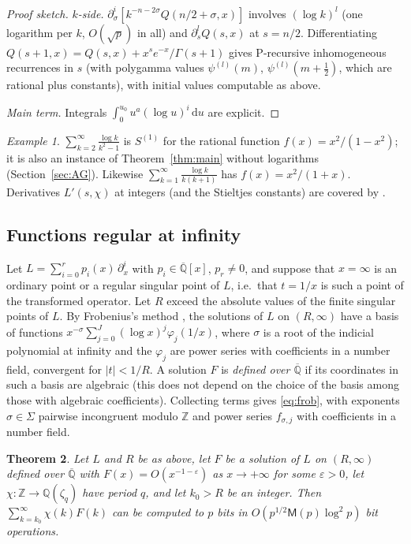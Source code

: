 \documentclass[11pt,reqno]{amsart}
\newtheorem{theorem}{Theorem}[section]
\theoremstyle{definition}
\theoremstyle{remark}
\newtheorem{example}[theorem]{Example}
\newcommand{\dd}{\,\mathrm{d}}
\newcommand{\QQ}{\mathbb{Q}}
\newcommand{\Qbar}{\overline{\mathbb{Q}}}
\newcommand{\ZZ}{\mathbb{Z}}
\newcommand{\Mul}{\mathsf{M}}
\begin{document}
\begin{proof}[Proof sketch]
\emph{$k$-side.} $\partial_\sigma^i[k^{-n-2\sigma}Q(n/2+\sigma, x)]$ involves $(\log k)^l$ (one logarithm per $k$, $O(\sqrt p)$ in all) and
$\partial_s^l Q(s, x)$ at $s = n/2$. Differentiating $Q(s+1, x) = Q(s, x) + x^se^{-x}/\Gamma(s+1)$ gives
P-recursive inhomogeneous recurrences in $s$ (with polygamma values $\psi^{(l)}(m)$, $\psi^{(l)}(m+\frac12)$, which
are rational plus constants), with initial values computable as above.

\emph{Main term.} Integrals $\int_0^{u_0}u^{a}(\log u)^i\dd u$ are explicit.
\end{proof}

\begin{example}
$\sum_{k=2}^{\infty}\frac{\log k}{k^2-1}$ is $S^{(1)}$ for the rational function $f(x) = x^2/(1-x^2)$; it is also an
instance of Theorem~\ref{thm:main} without logarithms (Section~\ref{sec:AG}). Likewise
$\sum_{k=1}^{\infty} \frac{\log k}{k(k+1)}$ has $f(x) = x^2/(1+x)$. Derivatives $L'(s,\chi)$ at integers
(and the Stieltjes constants) are covered by \cite{Joh21}.
\end{example}

\subsection{Functions regular at infinity}\label{sec:regular}

Let $L = \sum_{i=0}^r p_i(x)\,\partial_x^i$ with $p_i \in \Qbar[x]$, $p_r \ne 0$, and suppose that $x = \infty$ is an
ordinary point or a regular singular point of $L$, i.e.\ that $t = 1/x$ is such a point of the transformed
operator. Let $R$ exceed the absolute values of the finite singular points of $L$. By Frobenius's method
\cite[\S16]{Inc26}, the solutions of $L$ on $(R, \infty)$ have a basis of functions
$x^{-\sigma}\sum_{j=0}^{J}(\log x)^j\varphi_j(1/x)$, where $\sigma$ is a root of the indicial polynomial at infinity and
the $\varphi_j$ are power series with coefficients in a number field, convergent for $|t| < 1/R$. A solution $F$ is
\emph{defined over $\Qbar$} if its coordinates in such a basis are algebraic (this does not depend on the choice
of the basis among those with algebraic coefficients). Collecting terms gives \eqref{eq:frob}, with exponents
$\sigma \in \Sigma$ pairwise incongruent modulo $\ZZ$ and power series $f_{\sigma,j}$ with coefficients in a number field.

\begin{theorem}\label{thm:general}
Let $L$ and $R$ be as above, let $F$ be a solution of $L$ on $(R,\infty)$ defined over $\Qbar$ with
$F(x) = O(x^{-1-\varepsilon})$ as $x \to +\infty$ for some $\varepsilon > 0$, let $\chi \colon \ZZ \to \QQ(\zeta_q)$
have period $q$, and let $k_0 > R$ be an integer. Then $\sum_{k=k_0}^{\infty}\chi(k)F(k)$ can be computed to $p$ bits
in $O(p^{1/2}\Mul(p)\log^2 p)$ bit operations.
\end{theorem}
\end{document}

